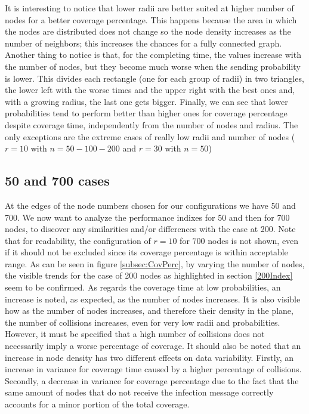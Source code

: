 It is interesting to notice that lower radii are better suited at higher number of nodes for a better coverage percentage. This happens because the area in which the nodes are distributed does not change so the node density increases as the number of neighbors; this increases the chances for a fully connected graph. 
Another thing to notice is that, for the completing time, the values increase with the number of nodes, but they become much worse when the sending probability is lower. This divides each rectangle (one for each group of radii) in two triangles, the lower left with the worse times and the upper right with the best ones and, with a growing radius, the last one gets bigger.
Finally, we can see that lower probabilities tend to perform better than higher ones for coverage percentage despite coverage time, independently from the number of nodes and radius. The only exceptions are the extreme cases of really low radii and number of nodes ($r=10$ with $n=50-100-200$ and $r=30$ with $n=50$)


\subsection{50 and 700 cases}\label{50-and-700-cases}

At the edges of the node numbers chosen for our configurations we have 50 and 700. We now want to analyze the performance indixes for 50 and then for 700 nodes, to discover any similarities and/or differences with the case at 200. Note that for readability, the configuration of $r=10$ for $700$ nodes is not shown, even if it should not be excluded since  its coverage percentage is within acceptable range. 
As can be seen in figure \ref{subsec:CovPerc}, by varying the number of nodes, the visible trends for the case of 200 nodes as highlighted in section \ref{200Index} seem to be confirmed. As regards the coverage time at low probabilities, an increase is noted, as expected, as the number of nodes increases. It is also visible how as the number of nodes increases, and therefore their density in the plane, the number of collisions increases, even for very low radii and probabilities. However, it must be specified that a high number of collisions does not necessarily imply a worse percentage of coverage. It should also be noted that an increase in node density has two different effects on data variability. Firstly, an increase in variance for coverage time caused by a higher percentage of collisions. Secondly, a decrease in variance for coverage percentage due to the fact that the same amount of nodes that do not receive the infection message correctly accounts for a minor portion of the total coverage. 


